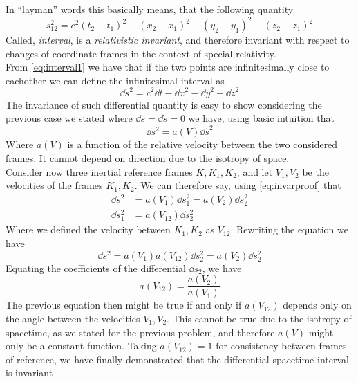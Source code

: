\documentclass[../admech.tex]{subfiles}
\begin{document}
In ``layman'' words this basically means, that the following quantity
\begin{equation}
	s^2_{12}=c^2(t_2-t_1)^2-(x_2-x_1)^2-(y_2-y_1)^2-(z_2-z_1)^2
	\label{eq:intervalsr}
\end{equation}
Called, \emph{interval}, is a \emph{relativistic invariant}, and therefore invariant with respect to changes of coordinate frames in the context of special relativity.\\
From \eqref{eq:interval1} we have that if the two points are infinitesimally close to eachother we can define the infinitesimal interval as
\begin{equation}
	\dd s^2=c^2\dd t-\dd x^2-\dd y^2-\dd z^2
	\label{eq:diffint}
\end{equation}
The invariance of such differential quantity is easy to show considering the previous case we stated where $\dd s=\dd\tilde{s}=0$ we have, using basic intuition that
\begin{equation}
	\dd s^2=a(V)\dd\tilde{s}^2
	\label{eq:invarproof}
\end{equation}
Where $a(V)$ is a function of the relative velocity between the two considered frames. It cannot depend on direction due to the isotropy of space.\\
Consider now three inertial reference frames $K,K_1,K_2$, and let $V_1,V_2$ be the velocities of the frames $K_1,K_2$. We can therefore say, using \eqref{eq:invarproof} that
\begin{equation}
	\begin{aligned}
		\dd s^2&=a(V_1)\dd s^2_1=a(V_2)\dd s^2_2\\
		\dd s^2_1&=a(V_{12})\dd s^2_2
	\end{aligned}
	\label{eq:invarproof2}
\end{equation}
Where we defined the velocity between $K_1,K_2$ as $V_{12}$. Rewriting the equation we have
\begin{equation*}
	\dd s^2=a(V_1)a(V_{12})\dd s^2_2=a(V_2)\dd s^2_2
\end{equation*}
Equating the coefficients of the differential $\dd s_2$, we have
\begin{equation}
	a(V_{12})=\frac{a(V_2)}{a(V_1)}
	\label{eq:v12lreq}
\end{equation}
The previous equation then might be true if and only if $a(V_{12})$ depends only on the angle between the velocities $V_1,V_2$. This cannot be true due to the isotropy of spacetime, as we stated for the previous problem, and therefore $a(V)$ might only be a constant function. Taking $a(V_{12})=1$ for consistency between frames of reference, we have finally demonstrated that the differential spacetime interval is invariant
\end{document}
